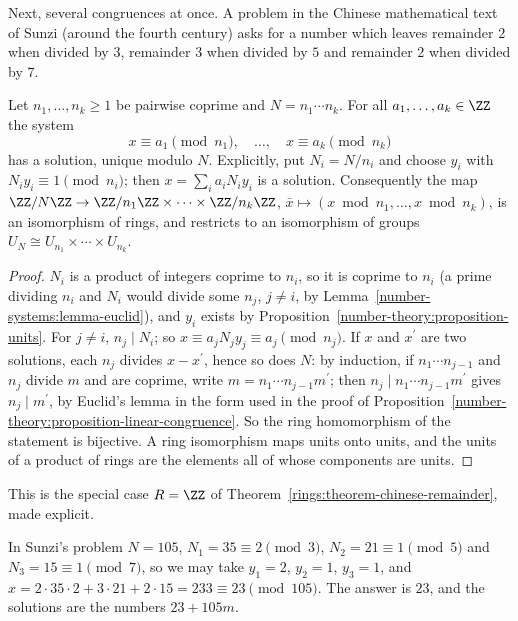 Next, several congruences at once. A problem in the Chinese mathematical text of Sunzi (around the fourth century) asks for a number which leaves remainder $2$ when divided by $3$, remainder $3$ when divided
by $5$ and remainder $2$ when divided by $7$.

\begin{theorem}\label{number-theory:theorem-crt}
Let $n_1, \ldots, n_k \geq 1$ be pairwise coprime and $N = n_1 \cdots n_k$. For all $a_1, \ldots, a_k \in \ZZ$ the system
\[
x \equiv a_1 \pmod{n_1}, \quad \ldots, \quad x \equiv a_k \pmod{n_k}
\]
has a solution, unique modulo $N$. Explicitly, put $N_i = N/n_i$ and choose $y_i$ with $N_iy_i \equiv 1 \pmod{n_i}$; then $x = \sum_ia_iN_iy_i$ is a solution. Consequently the map
$\ZZ/N\ZZ \to \ZZ/n_1\ZZ \times \cdots \times \ZZ/n_k\ZZ$, $\bar{x} \mapsto (x \bmod n_1, \ldots, x \bmod n_k)$, is an isomorphism of rings, and restricts to an isomorphism of groups
$U_N \cong U_{n_1} \times \cdots \times U_{n_k}$.
\end{theorem}

\begin{proof}
$N_i$ is a product of integers coprime to $n_i$, so it is coprime to $n_i$ (a prime dividing $n_i$ and $N_i$ would divide some $n_j$, $j \neq i$, by Lemma~\ref{number-systems:lemma-euclid}), and $y_i$
exists by Proposition~\ref{number-theory:proposition-units}. For $j \neq i$, $n_j \mid N_i$; so $x \equiv a_jN_jy_j \equiv a_j \pmod{n_j}$. If $x$ and $x^{\prime}$ are two solutions, each $n_j$ divides
$x - x^{\prime}$, hence so does $N$: by induction, if $n_1 \cdots n_{j-1}$ and $n_j$ divide $m$ and are coprime, write $m = n_1 \cdots n_{j-1}m^{\prime}$; then $n_j \mid n_1 \cdots n_{j-1}m^{\prime}$
gives $n_j \mid m^{\prime}$, by Euclid's lemma in the form used in the proof of Proposition~\ref{number-theory:proposition-linear-congruence}. So the ring homomorphism of the statement is bijective. A ring
isomorphism maps units onto units, and the units of a product of rings are the elements all of whose components are units.
\end{proof}

This is the special case $R = \ZZ$ of Theorem~\ref{rings:theorem-chinese-remainder}, made explicit.

\begin{example}\label{number-theory:example-sunzi}
In Sunzi's problem $N = 105$, $N_1 = 35 \equiv 2 \pmod 3$, $N_2 = 21 \equiv 1 \pmod 5$ and $N_3 = 15 \equiv 1 \pmod 7$, so we may take $y_1 = 2$, $y_2 = 1$, $y_3 = 1$, and
$x = 2 \cdot 35 \cdot 2 + 3 \cdot 21 + 2 \cdot 15 = 233 \equiv 23 \pmod{105}$. The answer is $23$, and the solutions are the numbers $23 + 105m$.
\end{example}

